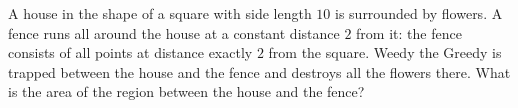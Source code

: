 A house in the shape of a square with side length $10$ is surrounded by flowers. A fence runs all around the house at a constant distance $2$ from it: the fence consists of all points at distance exactly $2$ from the square. Weedy the Greedy is trapped between the house and the fence and destroys all the flowers there. What is the area of the region between the house and the fence?
